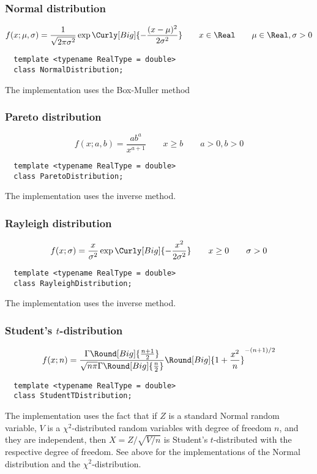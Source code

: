 \subsubsection{Normal distribution}

\begin{equation*}
  f(x;\mu,\sigma) =
  \frac{1}{\sqrt{2\pi\sigma^2}}\exp\Curly[Big]{-\frac{(x-\mu)^2}{2\sigma^2}}
  \qquad x \in \Real
  \qquad \mu \in \Real, \sigma > 0
\end{equation*}
\begin{Verbatim}
  template <typename RealType = double>
  class NormalDistribution;
\end{Verbatim}
The implementation uses the Box-Muller method \parencite{Box:1958hv}

\subsubsection{Pareto distribution}

\begin{equation*}
  f(x;a,b) = \frac{a b^a}{x^{a + 1}}
  \qquad x \ge b
  \qquad a > 0, b > 0
\end{equation*}
\begin{Verbatim}
  template <typename RealType = double>
  class ParetoDistribution;
\end{Verbatim}
The implementation uses the inverse method.

\subsubsection{Rayleigh distribution}

\begin{equation*}
  f(x;\sigma) = \frac{x}{\sigma^2}\exp\Curly[Big]{-\frac{x^2}{2\sigma^2}}
  \qquad x \ge 0
  \qquad \sigma > 0
\end{equation*}
\begin{Verbatim}
  template <typename RealType = double>
  class RayleighDistribution;
\end{Verbatim}
The implementation uses the inverse method.

\subsubsection{Student's $t$-distribution}

\begin{equation*}
  f(x;n) = \frac{\Gamma\Round[Big]{\frac{n + 1}{2}}}{
    \sqrt{n\pi}\Gamma\Round[Big]{\frac{n}{2}}}
  \Round[Big]{1 + \frac{x^2}{n}}^{-(n + 1)/2}
\end{equation*}
\begin{Verbatim}
  template <typename RealType = double>
  class StudentTDistribution;
\end{Verbatim}
The implementation uses the fact that if $Z$ is a standard Normal random
variable, $V$ is a $\chi^2$-distributed random variables with degree of freedom
$n$, and they are independent, then $X = Z / \sqrt{V / n}$ is Student's
$t$-distributed with the respective degree of freedom. See above for the
implementations of the Normal distribution and the $\chi^2$-distribution.

